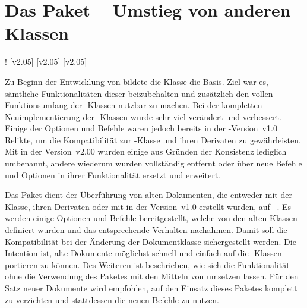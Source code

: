 \section{Das Paket  -- Umstieg von anderen Klassen}
\begin{Declaration*}{}!
%
[v2.05]
[v2.05]
[v2.05]
%
\noindent{}

\bigskip\noindent
Zu Beginn der Entwicklung von \TUDScript bildete die Klasse 
die Basis. Ziel war es, sämtliche Funktionalitäten dieser beizubehalten und 
zusätzlich den vollen Funktionsumfang der \KOMAScript-Klassen nutzbar zu 
machen. Bei der kompletten Neuimplementierung der \TUDScript-Klassen wurde sehr 
viel verändert und verbessert. Einige der Optionen und Befehle waren jedoch 
bereits in der \TUDScript-Version~v1.0 Relikte, um die Kompatibilität zur 
-Klasse und ihren Derivaten zu gewährleisten. Mit \TUDScript in 
der Version~v2.00 wurden einige aus Gründen der Konsistenz lediglich umbenannt, 
andere wiederum wurden vollständig entfernt oder über neue Befehle und Optionen 
in ihrer Funktionalität ersetzt und erweitert. 

Das Paket  dient der Überführung von alten Dokumenten, die 
entweder mit der -Klasse, ihren Derivaten oder mit \TUDScript in 
der Version~v1.0 erstellt wurden, auf \TUDScript~\vTUDScript. Es werden einige 
Optionen und Befehle bereitgestellt, welche von den alten Klassen definiert 
wurden und das entsprechende Verhalten nachahmen. Damit soll die Kompatibilität 
bei der Änderung der Dokumentklasse sichergestellt werden. Die Intention ist, 
alte Dokumente möglichst schnell und einfach auf die \TUDScript-Klassen 
portieren zu können. Des Weiteren ist beschrieben, wie sich die Funktionalität 
ohne die Verwendung des Paketes  mit den Mitteln von 
\TUDScript umsetzen lassen. Für den Satz neuer Dokumente wird empfohlen, auf 
den Einsatz dieses Paketes komplett zu verzichten und stattdessen die neuen 
Befehle zu nutzen.


\end{Declaration*}

